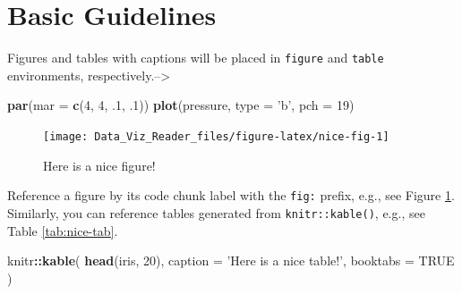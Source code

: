 \documentclass[]{book}
\newenvironment{Shaded}{\begin{snugshade}}{\end{snugshade}}
\newcommand{\KeywordTok}[1]{\textcolor[rgb]{0.13,0.29,0.53}{\textbf{#1}}}
\newcommand{\DataTypeTok}[1]{\textcolor[rgb]{0.13,0.29,0.53}{#1}}
\newcommand{\DecValTok}[1]{\textcolor[rgb]{0.00,0.00,0.81}{#1}}
\newcommand{\StringTok}[1]{\textcolor[rgb]{0.31,0.60,0.02}{#1}}
\newcommand{\OtherTok}[1]{\textcolor[rgb]{0.56,0.35,0.01}{#1}}
\newcommand{\OperatorTok}[1]{\textcolor[rgb]{0.81,0.36,0.00}{\textbf{#1}}}
\newcommand{\NormalTok}[1]{#1}
\theoremstyle{definition}
\theoremstyle{definition}
\theoremstyle{definition}
\theoremstyle{remark}
\begin{document}
\section{Basic Guidelines}\label{basic-guidelines}

Figures and tables with captions will be placed in \texttt{figure} and
\texttt{table} environments, respectively.--\textgreater{}

\begin{Shaded}
\begin{Highlighting}[]
\KeywordTok{par}\NormalTok{(}\DataTypeTok{mar =} \KeywordTok{c}\NormalTok{(}\DecValTok{4}\NormalTok{, }\DecValTok{4}\NormalTok{, .}\DecValTok{1}\NormalTok{, .}\DecValTok{1}\NormalTok{))}
\KeywordTok{plot}\NormalTok{(pressure, }\DataTypeTok{type =} \StringTok{'b'}\NormalTok{, }\DataTypeTok{pch =} \DecValTok{19}\NormalTok{)}
\end{Highlighting}
\end{Shaded}

\begin{figure}

{\centering \texttt{[image: Data\_Viz\_Reader\_files/figure-latex/nice-fig-1]} 

}

\caption{Here is a nice figure!}\label{fig:nice-fig}
\end{figure}

Reference a figure by its code chunk label with the \texttt{fig:}
prefix, e.g., see Figure \ref{fig:nice-fig}. Similarly, you can
reference tables generated from \texttt{knitr::kable()}, e.g., see Table
\ref{tab:nice-tab}.

\begin{Shaded}
\begin{Highlighting}[]
\NormalTok{knitr}\OperatorTok{::}\KeywordTok{kable}\NormalTok{(}
 \KeywordTok{head}\NormalTok{(iris, }\DecValTok{20}\NormalTok{), }\DataTypeTok{caption =} \StringTok{'Here is a nice table!'}\NormalTok{,}
 \DataTypeTok{booktabs =} \OtherTok{TRUE}
\NormalTok{)}
\end{Highlighting}
\end{Shaded}
\end{document}
